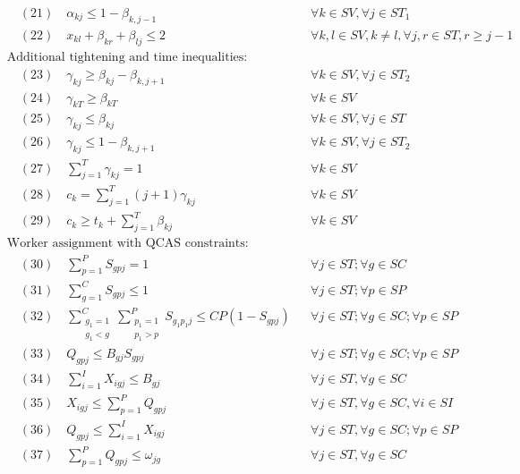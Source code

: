 \documentclass[10pt]{article}
\begin{document}
\begin{align*}
& \quad (21) \quad \alpha_{kj} \le 1 - \beta_{k, j-1} && \forall k \in SV, \forall j \in ST_1 \\
& \quad (22) \quad x_{kl} + \beta_{kr} + \beta_{lj} \le 2 && \forall k, l \in SV, k \neq l, \forall j, r \in ST, r \ge j-1 \\
& \text{Additional tightening and time inequalities:} \\
& \quad (23) \quad \gamma_{kj} \ge \beta_{kj} - \beta_{k, j+1} && \forall k \in SV, \forall j \in ST_2 \\
& \quad (24) \quad \gamma_{kT} \ge \beta_{kT} && \forall k \in SV \\
& \quad (25) \quad \gamma_{kj} \le \beta_{kj} && \forall k \in SV, \forall j \in ST \\
& \quad (26) \quad \gamma_{kj} \le 1 - \beta_{k, j+1} && \forall k \in SV, \forall j \in ST_2 \\
& \quad (27) \quad \sum_{j=1}^{T} \gamma_{kj} = 1 && \forall k \in SV \\
& \quad (28) \quad c_k = \sum_{j=1}^{T} (j+1) \gamma_{kj} && \forall k \in SV \\
& \quad (29) \quad c_k \ge t_k + \sum_{j=1}^{T} \beta_{kj} && \forall k \in SV \\
& \text{Worker assignment with QCAS constraints:} \\
& \quad (30) \quad \sum_{p=1}^{P} S_{gpj} = 1 && \forall j \in ST; \forall g \in SC \\
& \quad (31) \quad \sum_{g=1}^{C} S_{gpj} \le 1 && \forall j \in ST; \forall p \in SP \\
& \quad (32) \quad \sum_{\substack{g_1=1 \\ g_1<g}}^{C} \sum_{\substack{p_1=1 \\ p_1>p}}^{P} S_{g_1 p_1 j} \le CP(1 - S_{gpj}) && \forall j \in ST; \forall g \in SC; \forall p \in SP \\
& \quad (33) \quad Q_{gpj} \le B_{gj} S_{gpj} && \forall j \in ST; \forall g \in SC; \forall p \in SP \\
& \quad (34) \quad \sum_{i=1}^{I} X_{igj} \le B_{gj} && \forall j \in ST, \forall g \in SC \\
& \quad (35) \quad X_{igj} \le \sum_{p=1}^{P} Q_{gpj} && \forall j \in ST, \forall g \in SC, \forall i \in SI \\
& \quad (36) \quad Q_{gpj} \le \sum_{i=1}^{I} X_{igj} && \forall j \in ST, \forall g \in SC; \forall p \in SP \\
& \quad (37) \quad \sum_{p=1}^{P} Q_{gpj} \le \omega_{jg} && \forall j \in ST, \forall g \in SC \\

\end{align*}
\end{document}
